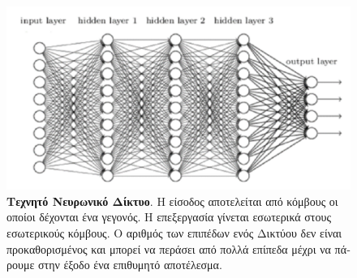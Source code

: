 \begin{figure}[H]
 \centering
 \includegraphics[width=\textwidth, scale=0.3]{Images/ann_2}

\caption[\textgreek{Νευρωνικό Δίκτυο}]{\textgreek{\textbf{Τεχνητό Νευρωνικό Δίκτυο}. Η είσοδος αποτελείται από κόμβους οι οποίοι δέχονται ένα γεγονός. Η επεξεργασία γίνεται εσωτερικά στους εσωτερικούς κόμβους. Ο αριθμός των επιπέδων ενός Δικτύου δεν είναι προκαθορισμένος και μπορεί να περάσει από πολλά επίπεδα μέχρι να πάρουμε στην έξοδο ένα επιθυμητό αποτέλεσμα.} \cite{brain_neuron}}
 \label{fig:ann}
\end{figure}

